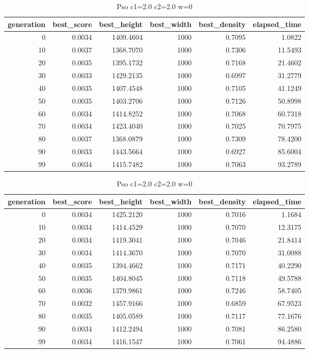 \begin{table}[htbp]
    \centering
    \caption{Pso c1=2.0 c2=2.0 w=0}
    \label{tab:pso_c1_2_0_c2_2_0_w_0}
    \begin{tabular}{rrrrrr}
    \toprule
    generation & best_score & best_height & best_width & best_density & elapsed_time \\
    \midrule
    0 & 0.0034 & 1409.4604 & 1000 & 0.7095 & 1.0822 \\
    10 & 0.0037 & 1368.7070 & 1000 & 0.7306 & 11.5493 \\
    20 & 0.0035 & 1395.1732 & 1000 & 0.7168 & 21.4602 \\
    30 & 0.0033 & 1429.2135 & 1000 & 0.6997 & 31.2779 \\
    40 & 0.0035 & 1407.4548 & 1000 & 0.7105 & 41.1249 \\
    50 & 0.0035 & 1403.2706 & 1000 & 0.7126 & 50.8998 \\
    60 & 0.0034 & 1414.8252 & 1000 & 0.7068 & 60.7318 \\
    70 & 0.0034 & 1423.4040 & 1000 & 0.7025 & 70.7975 \\
    80 & 0.0037 & 1368.0879 & 1000 & 0.7309 & 78.4200 \\
    90 & 0.0033 & 1443.5664 & 1000 & 0.6927 & 85.6004 \\
    99 & 0.0034 & 1415.7482 & 1000 & 0.7063 & 93.2789 \\
    \bottomrule
    \end{tabular}
\end{table}


\begin{table}[htbp]
    \centering
    \caption{Pso c1=2.0 c2=2.0 w=0}
    \label{tab:pso_c1_2_0_c2_2_0_w_0}
    \begin{tabular}{rrrrrr}
    \toprule
    generation & best_score & best_height & best_width & best_density & elapsed_time \\
    \midrule
    0 & 0.0034 & 1425.2120 & 1000 & 0.7016 & 1.1684 \\
    10 & 0.0034 & 1414.4529 & 1000 & 0.7070 & 12.3175 \\
    20 & 0.0034 & 1419.3041 & 1000 & 0.7046 & 21.8414 \\
    30 & 0.0034 & 1414.3670 & 1000 & 0.7070 & 31.0088 \\
    40 & 0.0035 & 1394.4662 & 1000 & 0.7171 & 40.2290 \\
    50 & 0.0035 & 1404.8045 & 1000 & 0.7118 & 49.5788 \\
    60 & 0.0036 & 1379.9861 & 1000 & 0.7246 & 58.7405 \\
    70 & 0.0032 & 1457.9166 & 1000 & 0.6859 & 67.9523 \\
    80 & 0.0035 & 1405.0589 & 1000 & 0.7117 & 77.1676 \\
    90 & 0.0034 & 1412.2494 & 1000 & 0.7081 & 86.2580 \\
    99 & 0.0034 & 1416.1547 & 1000 & 0.7061 & 94.4886 \\
    \bottomrule
    \end{tabular}
\end{table}


